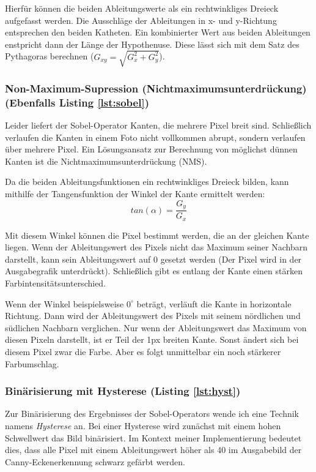 Hierfür können die beiden Ableitungswerte als ein rechtwinkliges Dreieck aufgefasst werden. Die Ausschläge der Ableitungen in x- und y-Richtung entsprechen den beiden Katheten. Ein kombinierter Wert aus beiden Ableitungen enstpricht dann der Länge der Hypothenuse. Diese lässt sich mit dem Satz des Pythagoras berechnen (\(G_{xy} = \sqrt{G_x^2 + G_y^2}\)).

\subsubsection{Non-Maximum-Supression (Nichtmaximumsunterdrückung) (Ebenfalls Listing \ref{lst:sobel})}
Leider liefert der Sobel-Operator Kanten, die mehrere Pixel breit sind. Schließlich verlaufen die Kanten in einem Foto nicht vollkommen abrupt, sondern verlaufen über mehrere Pixel. 
Ein Lösungsansatz zur Berechnung von möglichst dünnen Kanten ist die Nichtmaximumsunterdrückung (NMS). 

Da die beiden Ableitungsfunktionen ein rechtwinkliges Dreieck bilden, kann mithilfe der Tangensfunktion der Winkel der Kante ermittelt werden:
\begin{equation}
	tan(\alpha) = \frac{G_y}{G_x}
\end{equation}

Mit diesem Winkel können die Pixel bestimmt werden, die an der gleichen Kante liegen. Wenn der Ableitungswert des Pixels nicht das Maximum seiner Nachbarn darstellt, kann sein Ableitungswert auf 0 gesetzt werden (Der Pixel wird in der Ausgabegrafik unterdrückt). Schließlich gibt es entlang der Kante einen stärken Farbintensitätsunterschied.  

Wenn der Winkel beispielsweise \(0^{\circ}\) beträgt, verläuft die Kante in horizontale Richtung. Dann wird der Ableitungswert des Pixels mit seinem nördlichen und südlichen Nachbarn verglichen.
Nur wenn der Ableitungswert das Maximum von diesen Pixeln darstellt, ist er Teil der 1px breiten Kante. Sonst ändert sich bei diesem Pixel zwar die Farbe. Aber es folgt unmittelbar ein noch stärkerer Farbumschlag.

\subsubsection{Binärisierung mit Hysterese (Listing \ref{lst:hyst})}
Zur Binärisierung des Ergebnisses der Sobel-Operators wende ich eine Technik namens \textit{Hysterese} an. Bei einer Hysterese wird zunächst mit einem hohen Schwellwert das Bild binärisiert. 
Im Kontext meiner Implementierung bedeutet dies, dass alle Pixel mit einem Ableitungswert höher als 40 im Ausgabebild der Canny-Eckenerkennung schwarz gefärbt werden.

